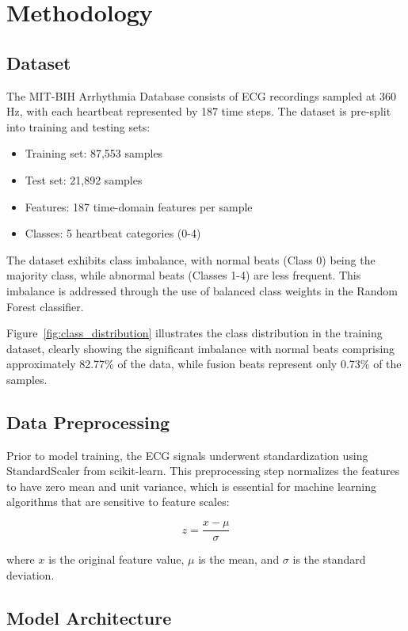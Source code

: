\documentclass[conference]{IEEEtran}
\begin{document}
\section{Methodology}

\subsection{Dataset}

The MIT-BIH Arrhythmia Database consists of ECG recordings sampled at 360 Hz, with each heartbeat represented by 187 time steps. The dataset is pre-split into training and testing sets:
\begin{itemize}
    \item Training set: 87,553 samples
    \item Test set: 21,892 samples
    \item Features: 187 time-domain features per sample
    \item Classes: 5 heartbeat categories (0-4)
\end{itemize}

The dataset exhibits class imbalance, with normal beats (Class 0) being the majority class, while abnormal beats (Classes 1-4) are less frequent. This imbalance is addressed through the use of balanced class weights in the Random Forest classifier.

Figure~\ref{fig:class_distribution} illustrates the class distribution in the training dataset, clearly showing the significant imbalance with normal beats comprising approximately 82.77\% of the data, while fusion beats represent only 0.73\% of the samples.

\subsection{Data Preprocessing}

Prior to model training, the ECG signals underwent standardization using StandardScaler from scikit-learn. This preprocessing step normalizes the features to have zero mean and unit variance, which is essential for machine learning algorithms that are sensitive to feature scales:

\begin{equation}
z = \frac{x - \mu}{\sigma}
\end{equation}

where $x$ is the original feature value, $\mu$ is the mean, and $\sigma$ is the standard deviation.

\subsection{Model Architecture}
\end{document}
